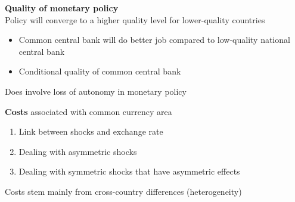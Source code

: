 \documentclass{beamer}
\begin{document}
\begin{frame}
  \textbf{Quality of monetary policy}\\ \medskip
  Policy will converge to a higher quality level for lower-quality countries
  \begin{itemize}
    \item Common central bank will do better job compared to low-quality national central bank 
    \item Conditional quality of common central bank
  \end{itemize}
  \medskip
  Does involve loss of autonomy in monetary policy
\end{frame}

\begin{frame}
  \textbf{Costs} associated with common currency area  
  \begin{enumerate}
    \item Link between shocks and exchange rate
    \item Dealing with asymmetric shocks
    \item Dealing with symmetric shocks that have asymmetric effects
  \end{enumerate}
  \medskip
  Costs stem mainly from cross-country differences (heterogeneity)
\end{frame}
\end{document}
